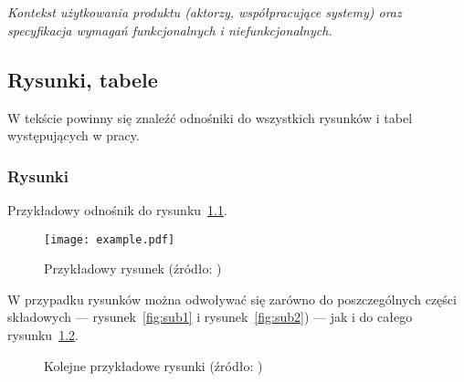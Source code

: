 \documentclass[polish]{aghengthesis}
\begin{document}
\chapter{\ChapterTitleScope}
\label{sec:zakres-funkcjonalnosci}

\emph{Kontekst użytkowania produktu (aktorzy, współpracujące systemy) oraz specyfikacja wymagań funkcjonalnych i niefunkcjonalnych.}

\section{Rysunki, tabele}
\label{sec:rysunki-tabele}

W tekście powinny się znaleźć odnośniki do wszystkich rysunków i tabel
występujących w pracy.

\subsection{Rysunki}
\label{sec:rysunki}

Przykładowy odnośnik do rysunku~\ref{fig:ex1}.

\begin{figure}[!htbp]
  \centering
\texttt{[image: example.pdf]}
\caption[Przykładowy rysunek]{Przykładowy rysunek (źródło:
  \cite{author2021title})}
\label{fig:ex1}
\end{figure}
 
W przypadku rysunków można odwoływać się zarówno do poszczególnych części
składowych --- rysunek~\ref{fig:sub1} i rysunek~\ref{fig:sub2}) --- jak i do
całego rysunku~\ref{fig:ex2}.

\begin{figure}[!htbp]
\begin{center}
%
\end{center}
\caption[Kolejne przykładowe rysunki]{Kolejne przykładowe rysunki (źródło:
  \cite{author2021title})}
\label{fig:ex2}
\end{figure}

\end{document}
